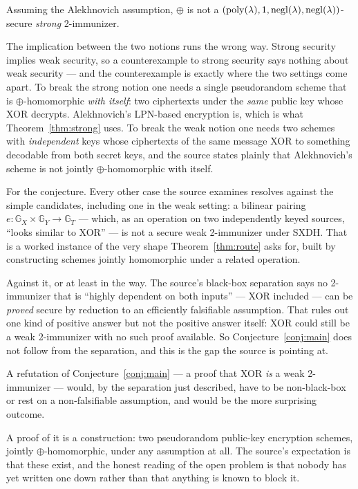 \documentclass{aicr-conjecture}
\newcommand{\negl}{\mathrm{negl}}
\begin{document}
\begin{remark}\label{rem:strongweak}
\begin{theorem}\label{thm:strong}
Assuming the Alekhnovich assumption, $\oplus$ is not a
$(\poly(\lambda), 1, \negl(\lambda), \negl(\lambda))$-secure
\emph{strong} 2-immunizer.
\end{theorem}
The implication between the two notions runs the wrong way. Strong
security implies weak security, so a counterexample to strong security
says nothing about weak security --- and the counterexample is exactly
where the two settings come apart. To break the strong notion one needs a
single pseudorandom scheme that is $\oplus$-homomorphic \emph{with
itself}: two ciphertexts under the \emph{same} public key whose XOR
decrypts. Alekhnovich's LPN-based encryption is, which is what
Theorem~\ref{thm:strong} uses. To break the weak notion one needs two
schemes with \emph{independent} keys whose ciphertexts of the same
message XOR to something decodable from both secret keys, and the source
states plainly that Alekhnovich's scheme is not jointly
$\oplus$-homomorphic with itself.
\end{remark}

\begin{remark}\label{rem:evidence}
For the conjecture. Every other case the source examines resolves against
the simple candidates, including one in the weak setting: a bilinear
pairing $e : \mathbb{G}_X \times \mathbb{G}_Y \to \mathbb{G}_T$ ---
which, as an operation on two independently keyed sources, ``looks
similar to XOR'' --- is not a secure weak 2-immunizer under SXDH\@. That is
a worked instance of the very shape Theorem~\ref{thm:route} asks for,
built by constructing schemes jointly homomorphic under a related
operation.

Against it, or at least in the way. The source's black-box separation
says no 2-immunizer that is ``highly dependent on both inputs'' --- XOR
included --- can be \emph{proved} secure by reduction to an efficiently
falsifiable assumption. That rules out one kind of positive answer but
not the positive answer itself: XOR could still be a weak 2-immunizer
with no such proof available. So Conjecture~\ref{conj:main} does not
follow from the separation, and this is the gap the source is pointing at.
\end{remark}

\begin{remark}\label{rem:resolution}
A refutation of Conjecture~\ref{conj:main} --- a proof that XOR
\emph{is} a weak 2-immunizer --- would, by the separation just described,
have to be non-black-box or rest on a non-falsifiable assumption, and
would be the more surprising outcome.

A proof of it is a construction: two pseudorandom public-key encryption
schemes, jointly $\oplus$-homomorphic, under any assumption at all. The
source's expectation is that these exist, and the honest reading of the
open problem is that nobody has yet written one down rather than that
anything is known to block it.
\end{remark}
\end{document}
